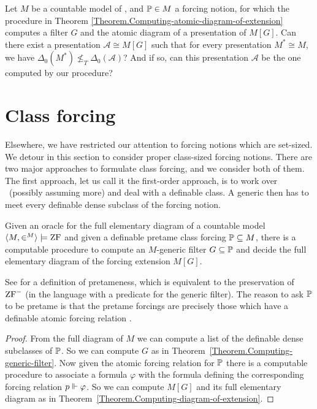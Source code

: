 \documentclass{amsart}
\begin{document}
\begin{question}
Let $M$ be a countable model of \ZFC, and $\P\in M$ a forcing notion, for which the
procedure in Theorem  \ref{Theorem.Computing-atomic-diagram-of-extension} computes
a filter $G$ and the atomic diagram of a presentation of $M[G]$.  Can there exist a
presentation $\mathcal A\cong M[G]$ such that for every presentation ${M^*} \cong M$, we have $\Delta_0({M^*}) \not \leq_T \Delta_0(\mathcal A)$?  And if so, can this presentation $\mathcal A$ be the one computed by our procedure?
\end{question}



\section{Class forcing}\label{Section.Class-forcing}

Elsewhere, we have restricted our attention to forcing notions which are set-sized. We detour in this section to consider proper class-sized forcing notions. There are two major approaches to formulate class forcing, and we consider both of them.
The first approach, let us call it the first-order approach, is to work over \ZF\  (possibly assuming more) and deal with a definable class. A generic then has to meet every definable dense subclass of the forcing notion.

\begin{theorem}
Given an oracle for the full elementary diagram of a countable model $\<M,\in^M> \models \ZF$ and given a definable pretame class forcing $\P \subseteq M$, there is a computable procedure to compute an $M$-generic filter $G \subseteq \P$ and decide the full elementary diagram of the forcing extension $M[G]$.
\end{theorem}

See \cite[Section 2.2]{friedman:book} for a definition of pretameness, which is equivalent to the preservation of $\ZF^-$ (in the language with a predicate for the generic filter). The reason to ask $\P$ to be pretame is that the pretame forcings are precisely those which have a definable atomic forcing relation \cite{HKS2018}.

\begin{proof}
From the full diagram of $M$ we can compute a list of the definable dense subclasses of $\P$. So we can compute $G$ as in Theorem~\ref{Theorem.Computing-generic-filter}. Now given the atomic forcing relation for $\P$ there is a computable procedure to associate a formula $\varphi$ with the formula defining the corresponding forcing relation $p \forces \varphi$. So we can compute $M[G]$ and its full elementary diagram as in Theorem~\ref{Theorem.Computing-diagram-of-extension}.
\end{proof}
\end{document}
